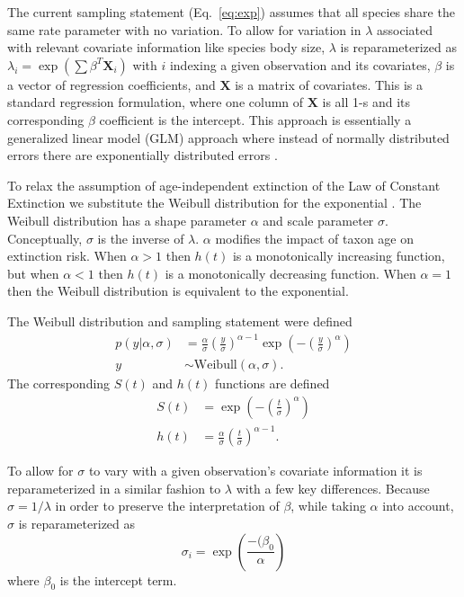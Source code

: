 \documentclass{article}
\begin{document}
The current sampling statement (Eq.~\ref{eq:exp}) assumes that all species share the same rate parameter with no variation. To allow for variation in \(\lambda\) associated with relevant covariate information like species body size, \(\lambda\) is reparameterized as \(\lambda_{i} = \exp(\sum \beta^{T}\mathbf{X}_{i})\) with \(i\) indexing a given observation and its covariates, \(\beta\) is a vector of regression coefficients, and \(\mathbf{X}\) is a matrix of covariates. This is a standard regression formulation, where one column of \(\mathbf{X}\) is all 1-s and its corresponding \(\beta\) coefficient is the intercept. This approach is essentially a generalized linear model (GLM) approach where instead of normally distributed errors there are exponentially distributed errors \cite{Klein2003}.

To relax the assumption of age-independent extinction of the Law of Constant Extinction we substitute the Weibull distribution for the exponential \cite{Klein2003}. The Weibull distribution has a shape parameter \(\alpha\) and scale parameter \(\sigma\). Conceptually, \(\sigma\) is the inverse of \(\lambda\). \(\alpha\) modifies the impact of taxon age on extinction risk. When \(\alpha > 1\) then \(h(t)\) is a monotonically increasing function, but when \(\alpha < 1\) then \(h(t)\) is a monotonically decreasing function. When \(\alpha = 1\) then the Weibull distribution is equivalent to the exponential.

The Weibull distribution and sampling statement were defined
\begin{align}
  p(y | \alpha, \sigma) &= \frac{\alpha}{\sigma} \left(\frac{y}{\sigma}\right)^{\alpha - 1} \exp\left(-\left(\frac{y}{\sigma}\right)^{\alpha}\right) \nonumber \\
  y &\sim \mathrm{Weibull}(\alpha, \sigma).
  \label{eq:weibull}
\end{align}
The corresponding \(S(t)\) and \(h(t)\) functions are defined
\begin{align}
  S(t) &= \exp\left(-\left(\frac{t}{\sigma}\right)^{\alpha}\right) \label{eq:wei_surv} \\
  h(t) &= \frac{\alpha}{\sigma}\left(\frac{t}{\sigma}\right)^{\alpha - 1} \label{eq:wei_haz}.
\end{align}

To allow for \(\sigma\) to vary with a given observation's covariate information it is reparameterized in a similar fashion to \(\lambda\) with a few key differences. Because \(\sigma = 1/\lambda\) in order to preserve the interpretation of \(\beta\), while taking \(\alpha\) into account, \(\sigma\) is reparameterized as
\begin{equation}
  \sigma_{i} = \exp\left(\frac{-(\beta_{0}}{\alpha}\right)
  \label{eq:reg}
\end{equation}
where \(\beta_{0}\) is the intercept term.
\end{document}
